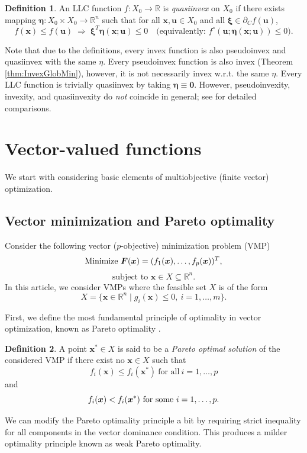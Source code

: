 \documentclass{article}
\theoremstyle{definition}
\newtheorem{maar}{Definition}[section]
\begin{document}
\begin{maar}\label{def:QInvex}
An LLC function $f:X_{0}\to\mathbb{R}$ is \emph{quasiinvex} on $X_{0}$ if there exists mapping 
$\boldsymbol\eta:X_{0}\times X_{0}\to\mathbb{R}^{n}$ such that for all
$\boldsymbol x,\boldsymbol u\in X_{0}$ and all $\boldsymbol\xi\in\partial_{C}f(\boldsymbol u)$,
\[
  f(\boldsymbol x)\le f(\boldsymbol u)
  \;\Longrightarrow\;
  \boldsymbol\xi^T\boldsymbol\eta(\boldsymbol x;\boldsymbol u)\le 0
  \quad\bigl(\text{equivalently: }f^{\circ}(\boldsymbol u;\boldsymbol\eta(\boldsymbol x;\boldsymbol u))\le 0\bigr).
\]
\end{maar}
Note that due to the definitions, every invex function is also pseudoinvex and quasiinvex with the same $\eta$. Every pseudoinvex function is also invex (Theorem \ref{thm:InvexGlobMin}), however, it is not necessarily invex w.r.t. the same $\eta$.  Every LLC function is trivially quasiinvex by taking $\boldsymbol\eta\equiv\boldsymbol 0$.  However, pseudoinvexity, invexity, and quasiinvexity do \emph{not} coincide in general; see \cite{BaKaMa} for detailed comparisons.


\section{Vector-valued functions}
We start with considering basic elements of multiobjective (finite vector) optimization.
\subsection{Vector minimization and Pareto optimality}\label{secPar}
 Consider the following vector ($p$-objective) minimization problem (VMP)
$$\textnormal{Minimize}\ \boldsymbol F(\boldsymbol x) = (f_1(\boldsymbol x),\dots,f_p(\boldsymbol x))^T,$$
$$  \text{subject to } \boldsymbol x \in X \subseteq \mathbb R^n.$$
In this article, we consider VMPs where the feasible set $X$ is of the form
$$X=\{\boldsymbol x \in \mathbb R^n \mid g_i(\boldsymbol{x}) \leq 0,\ i=1,\dots,m\}.$$

First, we define the most fundamental principle of optimality in vector optimization, known as Pareto optimality \cite{Pareto}.
\begin{maar}\label{Par}
A point $\boldsymbol x^* \in X$ is said to be a \emph{Pareto optimal solution} of the considered VMP if there exist no $\boldsymbol x \in X$ such that
$$f_i(\boldsymbol x) \leq f_i(\boldsymbol x^*)\ \text{for all}\ i=1,\dots,p$$
and
$$f_i(\boldsymbol x) < f_i(\boldsymbol x^*)\ \textnormal{for some}\ i=1,\dots,p.$$
\end{maar}
We can modify the Pareto optimality principle a bit by requiring strict inequality for all components in the vector dominance condition. This produces a milder optimality principle known as weak Pareto optimality. 
\end{document}
